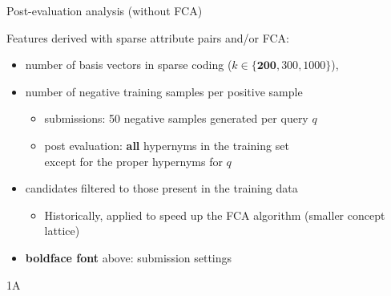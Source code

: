 \documentclass{beamer}
\newlength{\sepwid}
\newlength{\onecolwid}
\begin{document}
\begin{frame}[t]
\begin{columns}[t]
\begin{column}{\sepwid} %
\end{column}

\begin{column}{\onecolwid} %


  \begin{block}{Post-evaluation analysis (without FCA)}

    Features derived with \alert{sparse attribute pairs} and/or \alert{FCA}:
    

    \begin{itemize}
      \item number of basis vectors in sparse coding ($k \in 
        \{\mathbf{200}, 300, 1000\}$),
      \item number of \alert negative training \alert samples per positive sample 
        \begin{itemize}
          \item submissions: 50 negative samples generated per query $q$
          \item post evaluation: \textbf{all} hypernyms in the training set
            \\ except for the proper hypernyms for $q$ 
        \end{itemize}
      \item candidates filtered to those present in the training data
        \begin{itemize}
          \item Historically, applied to speed up the FCA algorithm
            (smaller concept lattice)
        \end{itemize}
      \item \textbf{boldface font} above: submission settings
    \end{itemize}

  \end{block}
  \begin{block}{1A}
       



\end{block}
\end{column}
\end{columns}
\end{frame}
\end{document}
